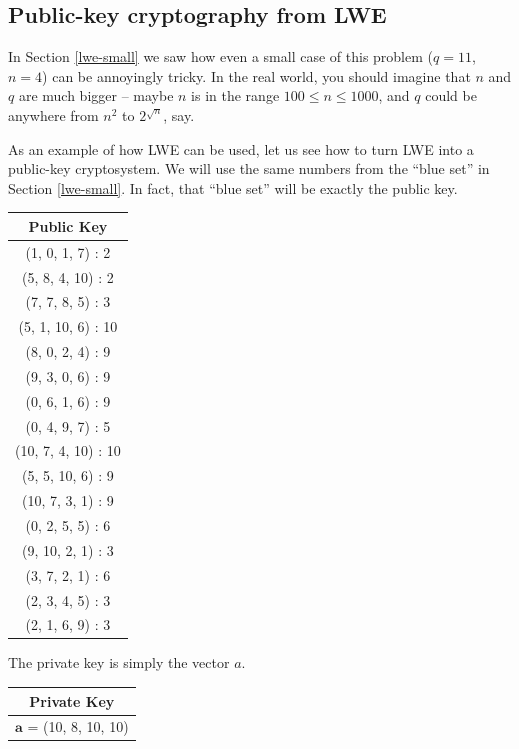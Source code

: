 \subsection{Public-key cryptography from LWE}\label{lwe-crypto}

In Section \ref{lwe-small} we saw how even a small case of this problem
(\(q = 11\), \(n = 4\)) can be annoyingly tricky. In the real world, you
should imagine that \(n\) and \(q\) are much bigger -- maybe \(n\) is in
the range \(100 \leq n \leq 1000\), and \(q\) could be anywhere from
\(n^{2}\) to \(2^{\sqrt{n}}\), say.

As an example of how LWE can be used, let us see how to turn LWE into a
public-key cryptosystem. We will use the same numbers from the ``blue
set'' in Section \ref{lwe-small}. In fact, that ``blue set'' will be exactly the
public key.

\begin{center}
\begin{tabular}{|c|}
\hline
Public Key \\
\hline
\hline
(1, 0, 1, 7) : 2 \\
\hline
(5, 8, 4, 10) : 2 \\
\hline
(7, 7, 8, 5) : 3 \\
\hline
(5, 1, 10, 6) : 10 \\
\hline
(8, 0, 2, 4) : 9 \\
\hline
(9, 3, 0, 6) : 9 \\
\hline
(0, 6, 1, 6) : 9 \\
\hline
(0, 4, 9, 7) : 5 \\
\hline
(10, 7, 4, 10) : 10 \\
\hline
(5, 5, 10, 6) : 9 \\
\hline
(10, 7, 3, 1) : 9 \\
\hline
(0, 2, 5, 5) : 6 \\
\hline
(9, 10, 2, 1) : 3 \\
\hline
(3, 7, 2, 1) : 6 \\
\hline
(2, 3, 4, 5) : 3 \\
\hline
(2, 1, 6, 9) : 3 \\
\hline
\end{tabular}
\end{center}

The private key is simply the vector \(a\).

\begin{center}
\begin{tabular}{|c|}
\hline
Private Key \\
\hline
\hline
\(\mathbf{a}\) = (10, 8, 10, 10) \\
\hline
\end{tabular}
\end{center}

